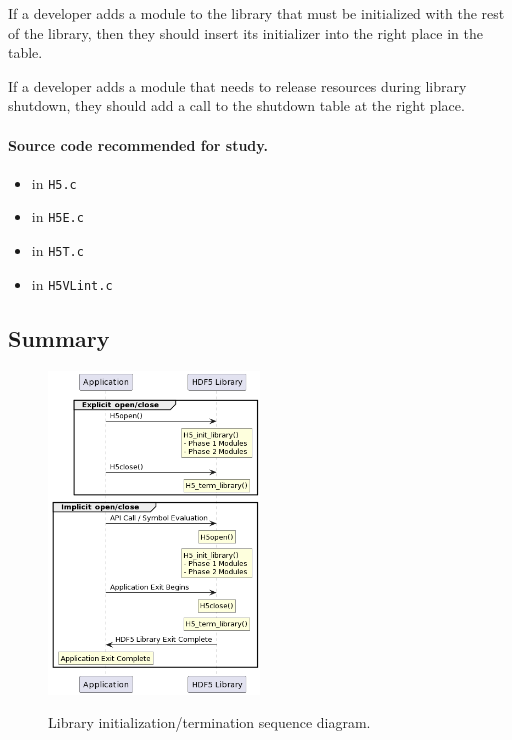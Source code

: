 If a developer adds a module to the library that must be initialized with the rest of the library, then they should insert its initializer into the right place in the table.

If a developer adds a module that needs to release resources during library shutdown, they should add a call to the shutdown table at the right place.

\paragraph{Source code recommended for study.}

\begin{itemize}
    \item {} in \texttt{H5.c}
    \item {} in \texttt{H5E.c}
    \item {} in \texttt{H5T.c}
    \item {} in \texttt{H5VLint.c}
\end{itemize}

\subsection{Summary}

\begin{figure}[h]
\centering
\includegraphics[width=0.5\textwidth]{images/tour_1_uml.png}
\label{fig:tour-1-uml}
\caption{Library initialization/termination sequence diagram.}
\end{figure}

